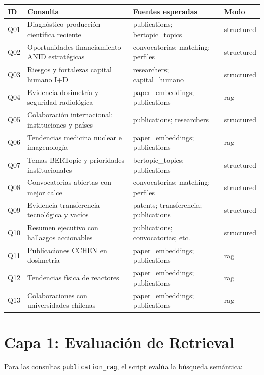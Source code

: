 \documentclass[12pt,a4paper]{report}
\begin{document}
\begin{center}
\begin{tabular}{L{1.5cm}L{6cm}L{4cm}L{2cm}}
  \toprule
  \textbf{ID} & \textbf{Consulta} & \textbf{Fuentes esperadas} & \textbf{Modo} \\
  \midrule
  Q01 & Diagnóstico producción científica reciente & publications; bertopic\_topics & structured \\
  Q02 & Oportunidades financiamiento ANID estratégicas & convocatorias; matching; perfiles & structured \\
  Q03 & Riesgos y fortalezas capital humano I+D & researchers; capital\_humano & structured \\
  Q04 & Evidencia dosimetría y seguridad radiológica & paper\_embeddings; publications & rag \\
  Q05 & Colaboración internacional: instituciones y países & publications; researchers & structured \\
  Q06 & Tendencias medicina nuclear e imagenología & paper\_embeddings; publications & rag \\
  Q07 & Temas BERTopic y prioridades institucionales & bertopic\_topics; publications & structured \\
  Q08 & Convocatorias abiertas con mejor calce & convocatorias; matching; perfiles & structured \\
  Q09 & Evidencia transferencia tecnológica y vacíos & patents; transferencia; publications & structured \\
  Q10 & Resumen ejecutivo con hallazgos accionables & publications; convocatorias; etc. & structured \\
  Q11 & Publicaciones CCHEN en dosimetría & paper\_embeddings; publications & rag \\
  Q12 & Tendencias física de reactores & paper\_embeddings; publications & rag \\
  Q13 & Colaboraciones con universidades chilenas & paper\_embeddings; publications & rag \\
  \bottomrule
\end{tabular}
\end{center}

\section{Capa 1: Evaluación de Retrieval}

Para las consultas \texttt{publication\_rag}, el script evalúa la búsqueda semántica:
\end{document}
